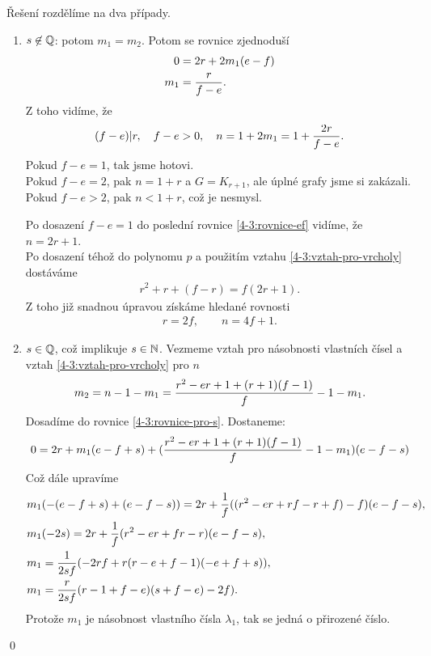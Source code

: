 Řešení rozdělíme na dva případy.
\begin{enumerate}
\item $s \not\in \mathbb{Q}$: potom $m_1 = m_2$. Potom se rovnice zjednoduší
\begin{align}
0 &= 2r +2m_{1}(e-f) \\
m_1 &= {r \over f-e}.
\end{align}
Z toho vidíme, že
\begin{align}
\label{4-3:rovnice-ef}
	(f-e)|r, \quad f-e > 0, \quad n = 1 + 2m_1 = 1 + {2r\over f-e}.
\end{align}
Pokud $f-e = 1$, tak jsme hotovi. \\
Pokud $f-e = 2$, pak $n = 1+r$ a $G = K_{r+1}$, ale úplné grafy jsme si zakázali. \\
Pokud $f-e > 2$, pak $n < 1+r$, což je nesmysl.

Po dosazení $f-e=1$ do poslední rovnice \ref{4-3:rovnice-ef} vidíme, že $n = 2r+1$. \\
Po dosazení téhož do polynomu $p$ a použitím vztahu \ref{4-3:vztah-pro-vrcholy} dostáváme
\begin{align}
r^2 + r + (f-r) = f(2r+1).
\end{align}
Z toho již snadnou úpravou získáme hledané rovnosti
\begin{align}
r = 2f, \qquad n = 4f+1.
\end{align}

\item $s \in \mathbb{Q}$, což implikuje $s \in \mathbb{N}$.
Vezmeme vztah pro násobnosti vlastních čísel a vztah \ref{4-3:vztah-pro-vrcholy} pro $n$
\begin{align}
m_2 = n - 1 - m_1 = {r^2 -er +1 +(r+1)(f-1) \over f} -1 -m_1.
\end{align}
Dosadíme do rovnice \ref{4-3:rovnice-pro-s}. Dostaneme:
\begin{align}
0 = 2r +m_1(e-f+s) + ({r^2 -er +1 +(r+1)(f-1) \over f} -1 -m_1)(e-f-s) 
\end{align}
Což dále upravíme
\begin{align}
& m_1(-(e-f+s)+(e-f-s)) = 2r + {1 \over f}((r^2 -er +rf -r +f)-f)(e-f-s), \\
& m_1(-2s) = 2r +{1 \over f}(r^2 -er +fr -r)(e-f-s), \\
& m_1 = {1 \over 2sf}(-2rf +r(r-e+f-1)(-e+f+s)), \\
& m_1 = {r \over 2sf}(r-1+f-e)(s+f-e) -2f).
\end{align}
Protože $m_1$ je násobnost vlastního čísla $\lambda_1$, tak se jedná o přirozené číslo.
\end{enumerate}
\qed

